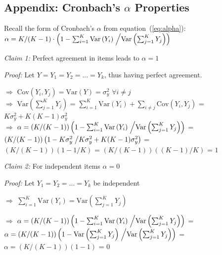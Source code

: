 \documentclass[11pt]{isuthesis}\usepackage[]{graphicx}\usepackage[]{color}
\newcommand{\V}[1]{\text{Var}\left(#1\right)}
\begin{document}
\begin{appendices}
\section{Appendix: Cronbach's $\alpha$ Properties}
\label{appendCronbach}

Recall the form of Cronbach's $\alpha$ from equation~(\ref{eq:alpha}):\\

$\alpha = K/(K-1) \cdot \left( 1- \sum_{i=1}^K \V{Y_i} \right.\left/  \V{\sum_{j=1}^K Y_j}  \right)$

\textit{Claim 1:} Perfect agreement in items leads to $\alpha = 1$ 

\textit{Proof:} Let $ Y = Y_1 = Y_2 = ... = Y_k$, thus having perfect agreement.

$\Rightarrow$  $\text{Cov}(Y_i, Y_j) = \V{Y} = \sigma^2_y $ \hspace{.1in} $\forall i\ne j$ \\

$\Rightarrow$  $\V{\sum_{j=1}^K Y_j }$ = $\sum_{i=1}^K \V{Y_i} + \sum_{i\ne j}\text{Cov}(Y_i, Y_j)$ =  $K\sigma^2_y + K(K-1)\sigma^2_y$ \\

$\Rightarrow$  $\alpha = \left(K/(K-1)\right) \left( 1- \sum_{i=1}^K \V{Y_i} \right.\left/  \V{\sum_{j=1}^K Y_j}  \right)$ = \\
\indent \hspace{.2in} $\left(K/(K-1)\right) \left( 1- K\sigma^2_y \right.\left/ K\sigma^2_y + K(K-1)\sigma^2_y \right)$ =\\
\indent \hspace{.2in} $\left(K/(K-1)\right)  (1- 1/K)$ = $\left(K/(K-1)\right) ((K-1)/K)$ = $1$ \\

\vspace{.25in} %

\textit{Claim 2:} For independent items $\alpha = 0$ 

\textit{Proof:} Let $Y_1 = Y_2 = ... = Y_k$ be independent 

$\Rightarrow$ $\sum_{i=1}^K \V{Y_i} = \V{\sum_{j=1}^K Y_j} $ 

$\Rightarrow$  $\alpha = \left(K/(K-1)\right) \left( 1- \sum_{i=1}^K \V{Y_i} \right.\left/  \V{\sum_{j=1}^K Y_j}  \right)$ = \\
\indent \hspace{.2in} $\alpha = \left(K/(K-1)\right) \left( 1- \V{\sum_{j=1}^K Y_j} \right.\left/  \V{\sum_{j=1}^K Y_j}  \right)$ = \\
\indent \hspace{.2in} $\alpha = \left(K/(K-1)\right) \left( 1- 1 \right)$ = 0 


\end{appendices}
\end{document}
